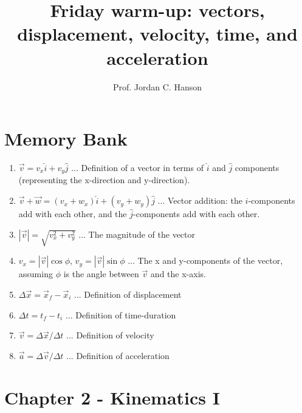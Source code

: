 \documentclass{article}
\begin{document}
\twocolumn

\title{Friday warm-up: vectors, displacement, velocity, time, and acceleration}
\author{Prof. Jordan C. Hanson}

\maketitle

\section{Memory Bank}

\begin{enumerate}
\item $\vec{v} = v_x \hat{i} + v_y \hat{j}$ ... Definition of a vector in terms of $\hat{i}$ and $\hat{j}$ components (representing the x-direction and y-direction).
\item $\vec{v} + \vec{w} = (v_x + w_x) \hat{i} + (v_y + w_y) \hat{j}$ ... Vector addition: the $\hat{i}$-components add with each other, and the $\hat{j}$-components add with each other.\
\item $|\vec{v}| = \sqrt{v_x^2 + v_y^2}$ ... The magnitude of the vector
\item $v_x = |\vec{v}| \cos\phi$, $v_y = |\vec{v}| \sin\phi$ ... The x and y-components of the vector, assuming $\phi$ is the angle between $\vec{v}$ and the x-axis.
\item $\Delta \vec{x} = \vec{x}_f - \vec{x}_i$ ... Definition of displacement
\item $\Delta t = t_f - t_i$ ... Definition of time-duration
\item $\vec{v} = \Delta \vec{x}/\Delta t$ ... Definition of velocity
\item $\vec{a} = \Delta \vec{v}/\Delta t$ ... Definition of acceleration
\end{enumerate}

\section{Chapter 2 - Kinematics I}
\end{document}
